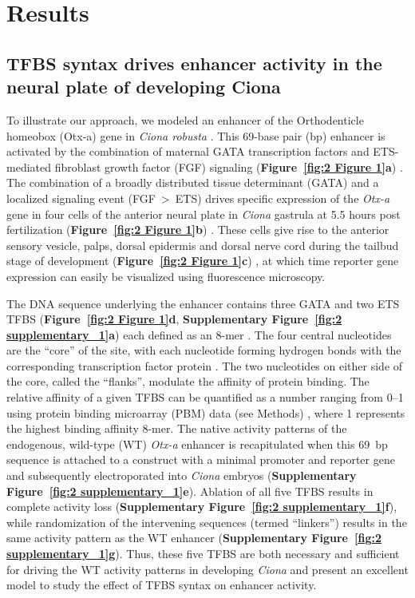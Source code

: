 \section{Results}

\subsection{TFBS syntax drives enhancer activity in the neural plate of developing Ciona}

To illustrate our approach, we modeled an enhancer of the Orthodenticle homeobox (Otx-a) gene in \textit{Ciona robusta} \cite{Delsuc2006-nq}. This 69-base pair (bp) enhancer is activated by the combination of maternal GATA transcription factors and ETS-mediated fibroblast growth factor (FGF) signaling (\textbf{Figure~\ref{fig:2 Figure 1}a}) \cite{Bertrand2003-su,Rothbacher2007-rt,Williaume2021-wk}. The combination of a broadly distributed tissue determinant (GATA) and a localized signaling event (FGF~>~ETS) drives specific expression of the \textit{Otx-a} gene in four cells of the anterior neural plate in \textit{Ciona} gastrula at 5.5 hours post fertilization (\textbf{Figure~\ref{fig:2 Figure 1}b}) \cite{Acampora2005-bo,Beby2013-xq}. These cells give rise to the anterior sensory vesicle, palps, dorsal epidermis and dorsal nerve cord during the tailbud stage of development (\textbf{Figure~\ref{fig:2 Figure 1}c}) \cite{Acampora2005-bo,Beby2013-xq}, at which time reporter gene expression can easily be visualized using fluorescence microscopy.

The DNA sequence underlying the enhancer contains three GATA and two ETS TFBS (\textbf{Figure~\ref{fig:2 Figure 1}d}, \textbf{Supplementary Figure~\ref{fig:2 supplementary_1}a}) each defined as an 8-mer \cite{Bertrand2003-su}. The four central nucleotides are the “core” of the site, with each nucleotide forming hydrogen bonds with the corresponding transcription factor protein \cite{Bates2008-go,Pio1996-gj}. The two nucleotides on either side of the core, called the “flanks”, modulate the affinity of protein binding. The relative affinity of a given TFBS can be quantified as a number ranging from 0--1 using protein binding microarray (PBM) data (see Methods) \cite{Nitta2015-rt,Hume2015-xj,Wei2010-di,Badis2009-hv}, where 1 represents the highest binding affinity 8-mer. The native activity patterns of the endogenous, wild-type (WT) \textit{Otx-a} enhancer is recapitulated when this 69~bp sequence is attached to a construct with a minimal promoter and reporter gene and subsequently electroporated into \textit{Ciona} embryos (\textbf{Supplementary Figure~\ref{fig:2 supplementary_1}e}). Ablation of all five TFBS results in complete activity loss (\textbf{Supplementary Figure~\ref{fig:2 supplementary_1}f}), while randomization of the intervening sequences (termed “linkers”) results in the same activity pattern as the WT enhancer (\textbf{Supplementary Figure~\ref{fig:2 supplementary_1}g}). Thus, these five TFBS are both necessary and sufficient for driving the WT activity patterns in developing \textit{Ciona} and present an excellent model to study the effect of TFBS syntax on enhancer activity.

